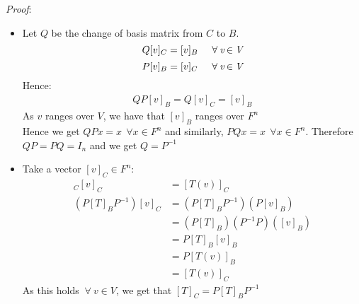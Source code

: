 \documentclass{report}
\theoremstyle{remark}
\theoremstyle{definition}
\theoremstyle{definition}
\theoremstyle{theorem}
\begin{document}
\emph{Proof}:
\begin{itemize}
    \item Let $Q$ be the change of basis matrix from $C$ to $B$. 
    $$\emph{$Q[v]_C = [v]_B \hspace{5mm} \forall \> $v$ \> \in \> $V$ $}$$
    $$\emph{$P[v]_B = [v]_C \hspace{5mm} \forall \> $v$ \> \in \> $V$ $}$$
    Hence:
    \begin{align*}
        QP[v]_B = Q[v]_C = [v]_B
    \end{align*}
     As $v$ ranges over $V$, we have that $[v]_B$ ranges over $F^n$\\
     Hence we get $QPx = x \>\> \forall x \in F^n$ and similarly, $PQx = x \>\> \forall x \in F^n$. Therefore $QP=PQ=I_n$ and we get $Q=P^{-1}$
     \item Take a vector $[v]_C \in F^n$:
     \begin{align*}
         [T]_C[v]_C &= [T(v)]_C\\
         (P[T]_BP^{-1})[v]_C &= (P[T]_BP^{-1})(P[v]_B)\\
         &= (P[T]_B)(P^{-1}P)([v]_B)\\
         &= P[T]_B[v]_B\\
         &= P[T(v)]_B\\
         &= [T(v)]_C
     \end{align*}
    As this holds $\> \forall \> v \in V$, we get that $[T]_C = P[T]_BP^{-1}$
\end{itemize}
\end{document}
